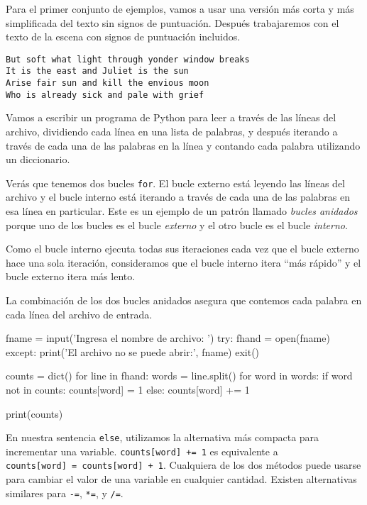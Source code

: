 Para el primer conjunto de ejemplos, vamos a usar una versión más corta
y más simplificada del texto sin signos de puntuación. Después
trabajaremos con el texto de la escena con signos de puntuación
incluidos.

\begin{verbatim}
But soft what light through yonder window breaks
It is the east and Juliet is the sun
Arise fair sun and kill the envious moon
Who is already sick and pale with grief
\end{verbatim}

Vamos a escribir un programa de Python para leer a través de las líneas
del archivo, dividiendo cada línea en una lista de palabras, y después
iterando a través de cada una de las palabras en la línea y contando
cada palabra utilizando un diccionario.

 

Verás que tenemos dos bucles \texttt{for}. El bucle externo está leyendo
las líneas del archivo y el bucle interno está iterando a través de cada
una de las palabras en esa línea en particular. Este es un ejemplo de un
patrón llamado \emph{bucles anidados} porque uno de los bucles es el
bucle \emph{externo} y el otro bucle es el bucle \emph{interno}.

Como el bucle interno ejecuta todas sus iteraciones cada vez que el
bucle externo hace una sola iteración, consideramos que el bucle interno
itera ``más rápido'' y el bucle externo itera más lento.


La combinación de los dos bucles anidados asegura que contemos cada
palabra en cada línea del archivo de entrada.

\begin{python}[frame=single]
fname = input('Ingresa el nombre de archivo: ')
try:
    fhand = open(fname)
except:
    print('El archivo no se puede abrir:', fname)
    exit()

counts = dict()
for line in fhand:
    words = line.split()
    for word in words:
        if word not in counts:
            counts[word] = 1
        else:
            counts[word] += 1

print(counts)
\end{python}

En nuestra sentencia \texttt{else}, utilizamos la alternativa más
compacta para incrementar una variable. \texttt{counts{[}word{]}\ +=\ 1}
es equivalente a \texttt{counts{[}word{]}\ =\ counts{[}word{]}\ +\ 1}.
Cualquiera de los dos métodos puede usarse para cambiar el valor de una
variable en cualquier cantidad. Existen alternativas similares para
\texttt{-=}, \texttt{*=}, y \texttt{/=}.


